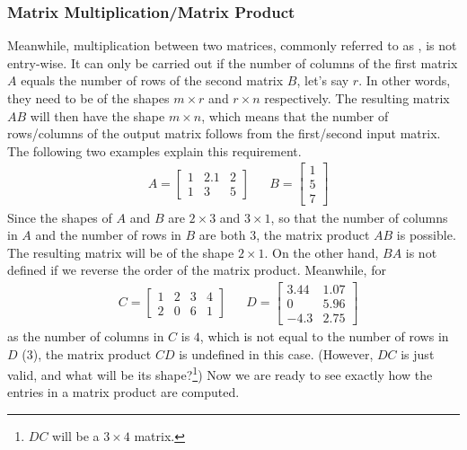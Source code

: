 \subsubsection{Matrix Multiplication/Matrix Product} Meanwhile, multiplication between two matrices, commonly referred to as , is not entry-wise. It can only be carried out if the number of columns of the first matrix $A$ equals the number of rows of the second matrix $B$, let's say $r$. In other words, they need to be of the shapes $m \times r$ and $r \times n$ respectively. The resulting matrix $AB$ will then have the shape $m \times n$, which means that the number of rows/columns of the output matrix follows from the first/second input matrix. The following two examples explain this requirement.
\begin{align*}
& A = 
\begin{bmatrix}
1 & 2.1 & 2 \\
1 & 3 & 5
\end{bmatrix} &
& B = 
\begin{bmatrix}
1 \\
5 \\
7
\end{bmatrix}
\end{align*}
Since the shapes of $A$ and $B$ are $2 \times 3$ and $3 \times 1$, so that the number of columns in $A$ and the number of rows in $B$ are both $3$, the matrix product $AB$ is possible. The resulting matrix will be of the shape $2 \times 1$. On the other hand, $BA$ is not defined if we reverse the order of the matrix product. Meanwhile, for
\begin{align*}
& C = 
\begin{bmatrix}
1 & 2 & 3 & 4 \\
2 & 0 & 6 & 1
\end{bmatrix} &
& D = 
\begin{bmatrix}
3.44 & 1.07\\
0 & 5.96\\
-4.3 & 2.75
\end{bmatrix}
\end{align*}
as the number of columns in $C$ is $4$, which is not equal to the number of rows in $D$ ($3$), the matrix product $CD$ is undefined in this case. (However, $DC$ is just valid, and what will be its shape?\footnote{$DC$ will be a $3 \times 4$ matrix.}) Now we are ready to see exactly how the entries in a matrix product are computed.

